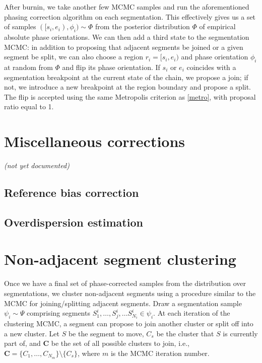\documentclass[10pt,letter]{article}
\numberwithin{equation}{section}
\begin{document}
After burnin, we take another few MCMC samples and run the aforementioned phasing correction algorithm on each segmentation. This effectively gives us a set of samples $([s_i,e_i),\phi_i)\sim\Phi$ from the posterior distribution $\Phi$ of empirical absolute phase orientations. We can then add a third state to the segmentation MCMC: in addition to proposing that adjacent segments be joined or a given segment be split, we can also choose a region $r_i=[s_i,e_i)$ and phase orientation $\phi_i$ at random from $\Phi$ and flip its phase orientation. If $s_i$ or $e_i$ coincides with a segmentation breakpoint at the current state of the chain, we propose a join; if not, we introduce a new breakpoint at the region boundary and propose a split. The flip is accepted using the same Metropolis criterion as \eqref{metro}, with proposal ratio equal to 1.

\section{Miscellaneous corrections}

\textit{(not yet documented)}

\subsection{Reference bias correction}

\subsection{Overdispersion estimation}



\section{Non-adjacent segment clustering}

Once we have a final set of phase-corrected samples from the distribution over segmentations, we cluster non-adjacent segments using a procedure similar to the MCMC for joining/splitting adjacent segments. Draw a segmentation sample $\psi_i\sim\Psi$ comprising segments $S^i_1,\dots, S^i_j,\dots S^i_{N_i}\in \psi_i$. At each iteration of the clustering MCMC, a segment can propose to join another cluster or split off into a new cluster. Let $S$ be the segment to move, $C_s$ be the cluster that $S$ is currently part of, and $\mathbf C$ be the set of all possible clusters to join, i.e., $\mathbf{C} = \{C_1,\dots,C_{N_m}\}\setminus\{C_s\}$, where $m$ is the MCMC iteration number.
\end{document}
